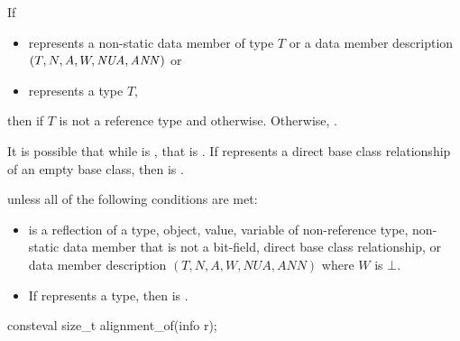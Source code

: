\begin{itemdescr}
\pnum
\returns
If
\begin{itemize}
\item {} represents a non-static data member of type $T$ or
a data member description $(T, N, A, W, \mathit{NUA},\brk{} \mathit{ANN})$ or
\item {} represents a type $T$,
\end{itemize}
then  if $T$ is not a reference type
and  otherwise.
Otherwise, .
\begin{note}
It is possible that while 
is ,
that 
is .
If  represents a direct base class relationship of an empty base class,
then  is .
\end{note}

\pnum
\throws
{} unless
all of the following conditions are met:
\begin{itemize}
\item
{} is a reflection of a
type,
object,
value,
variable of non-reference type,
non-static data member that is not a bit-field,
direct base class relationship, or
data member description $(T, N, A, W, \mathit{NUA}, \mathit{ANN})$
where $W$ is $\bot$.
\item
If  represents a type,
then  is .
\end{itemize}
\end{itemdescr}

%
\begin{itemdecl}
consteval size_t alignment_of(info r);
\end{itemdecl}

